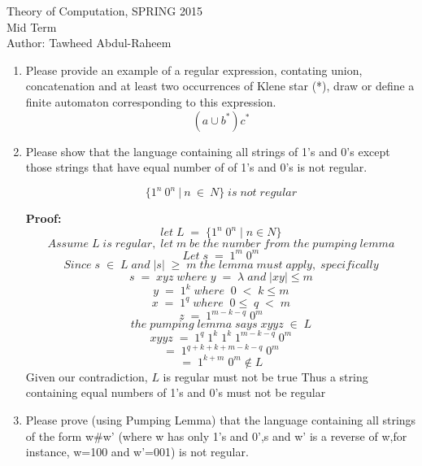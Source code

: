 \documentclass[12pt]{article}
\begin{document}
\begin{center}
    Theory of Computation, SPRING 2015 \\
    Mid Term\\
    Author: Tawheed Abdul-Raheem\\
\end{center}

\smallskip

\begin{enumerate}
    \item Please provide an example of a regular expression, contating union, concatenation and  at least two occurrences of Klene star (*), draw or define a finite automaton corresponding to this expression.
    \[ (a \cup b^*)c^* \]
    
    
    
    \item Please show that the language containing all strings of 1's and 0's except those strings that have equal number of of 1's and 0's is not regular.
    
    \[ \{1^n \: 0^n \: | \: n \: \in \: N \} \; is \; not \; regular\]
    
    \textbf{Proof:}
    \[ let \; L  \; = \; \{1^n \; 0^n \; | \; n \in N \}\]
    \[Assume \; L \; is  \; regular,  \;let  \; m  \;be \; the \; number \; from  \;the  \;pumping \; lemma \]
    \[ Let  \; s  \; =  \; 1^m  \; 0^m\]
    \[ Since  \;  s \; \in  \; L  \; and  \;|s|   \;\geq \; m \; the  \; lemma  \; must  \; apply,  \; specifically\]
    \[s  \; =  \; xyz  \; where  \; y  \;= \; \lambda  \; and  \; |xy| \leq m  \]
    \[ y  \; =  \; 1^k  \; where  \;  \; 0  \; <  \; k \leq m\]
    \[x  \; =  \; 1^q  \; where  \;  \; 0 \leq  \;q  \;< \; m \]
    \[z  \; =  \; 1^{m-k-q} \;0^m \]
    \[the  \;pumping  \;lemma  \;says \; xyyz  \;\in  \;L \]
    \[xyyz  \; =  \; 1^q \; 1^k \;1^k \;1^{m-k-q} \;0^m \]
    \[ =  \; 1^{q+k+k+m-k-q} \; 0^m\]
    \[=  \; 1^{k+m} \;0^m \notin L\]
Given our contradiction, $L$ is regular must not be true
Thus a string containing equal numbers of 1's and 0's must not be regular
    \item Please prove (using Pumping Lemma) that the language containing all strings of the form w\#w' (where w has only 1's and 0',s and w' is a reverse of w,for instance, w=100 and w'=001) is not regular. 
    

\end{enumerate}
\end{document}
